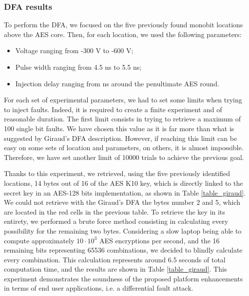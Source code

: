 		\subsubsection{DFA results}
			To perform the DFA, we focused on the five previously found monobit locations above the AES core.
			Then, for each location, we used the following parameters:
			\begin{itemize}
				\item Voltage ranging from -300 V to -600 V;
				\item Pulse width ranging from 4.5 ns to 5.5 ns;
				\item Injection delay ranging from  ns around the penultimate AES round.
			\end{itemize}
			For each set of experimental parameters, we had to set some limits when trying to inject faults.
			Indeed, it is required to create a finite experiment and of reasonable duration.
			The first limit consists in trying to retrieve a maximum of 100 single bit faults.
			We have chosen this value as it is far more than what is suggested by Giraud's DFA \cite{giraudDfa} description.
			However, if reaching this limit can be easy on some sets of location and parameters, on others, it is almost impossible.
			Therefore, we have set another limit of 10000 trials to achieve the previous goal.
			
			Thanks to this experiment, we retrieved, using the five previously identified locations, 14 bytes out of 16 of the AES K10 key, which is directly linked to the secret key in an AES-128 bits implementation, as shown in Table \ref{table_giraud}.
			We could not retrieve with the Giraud's DFA the bytes number 2 and 5, which are located in the red cells in the previous table.
			To retrieve the key in its entirety, we performed a brute force method consisting in calculating every possibility for the remaining two bytes.
			Considering a slow laptop being able to compute approximately $10 \cdot 10^3$ AES encryptions per second, and the 16 remaining bits representing 65536 combinations, we decided to blindly calculate every combination.
			This calculation represents around 6.5 seconds of total computation time, and the results are shown in Table \ref{table_giraud}.
			This experiment demonstrates the soundness of the proposed platform enhancements in terms of end user applications, i.e. a differential fault attack.

